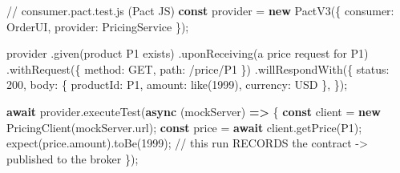 \documentclass[11pt]{article}
\newenvironment{Shaded}{\begin{snugshade}}{\end{snugshade}}
\newcommand{\AttributeTok}[1]{\textcolor[rgb]{0.16,0.50,0.73}{#1}}
\newcommand{\CommentTok}[1]{\textcolor[rgb]{0.48,0.49,0.49}{#1}}
\newcommand{\ControlFlowTok}[1]{\textcolor[rgb]{0.99,0.74,0.29}{\textbf{#1}}}
\newcommand{\DataTypeTok}[1]{\textcolor[rgb]{0.16,0.50,0.73}{#1}}
\newcommand{\DecValTok}[1]{\textcolor[rgb]{0.96,0.45,0.00}{#1}}
\newcommand{\FunctionTok}[1]{\textcolor[rgb]{0.56,0.27,0.68}{#1}}
\newcommand{\KeywordTok}[1]{\textcolor[rgb]{0.81,0.81,0.76}{\textbf{#1}}}
\newcommand{\NormalTok}[1]{\textcolor[rgb]{0.81,0.81,0.76}{#1}}
\newcommand{\OperatorTok}[1]{\textcolor[rgb]{0.81,0.81,0.76}{#1}}
\newcommand{\StringTok}[1]{\textcolor[rgb]{0.96,0.31,0.31}{#1}}
\begin{document}
\begin{Shaded}
\begin{Highlighting}[]
\CommentTok{// consumer.pact.test.js  (Pact JS)}
\KeywordTok{const}\NormalTok{ provider }\OperatorTok{=} \KeywordTok{new} \FunctionTok{PactV3}\NormalTok{(\{ }\DataTypeTok{consumer}\OperatorTok{:} \StringTok{\textquotesingle{}OrderUI\textquotesingle{}}\OperatorTok{,} \DataTypeTok{provider}\OperatorTok{:} \StringTok{\textquotesingle{}PricingService\textquotesingle{}}\NormalTok{ \})}\OperatorTok{;}

\NormalTok{provider}
  \OperatorTok{.}\FunctionTok{given}\NormalTok{(}\StringTok{\textquotesingle{}product P1 exists\textquotesingle{}}\NormalTok{)}
  \OperatorTok{.}\FunctionTok{uponReceiving}\NormalTok{(}\StringTok{\textquotesingle{}a price request for P1\textquotesingle{}}\NormalTok{)}
  \OperatorTok{.}\FunctionTok{withRequest}\NormalTok{(\{ }\DataTypeTok{method}\OperatorTok{:} \StringTok{\textquotesingle{}GET\textquotesingle{}}\OperatorTok{,} \DataTypeTok{path}\OperatorTok{:} \StringTok{\textquotesingle{}/price/P1\textquotesingle{}}\NormalTok{ \})}
  \OperatorTok{.}\FunctionTok{willRespondWith}\NormalTok{(\{}
    \DataTypeTok{status}\OperatorTok{:} \DecValTok{200}\OperatorTok{,}
    \DataTypeTok{body}\OperatorTok{:}\NormalTok{ \{ }\DataTypeTok{productId}\OperatorTok{:} \StringTok{\textquotesingle{}P1\textquotesingle{}}\OperatorTok{,} \DataTypeTok{amount}\OperatorTok{:} \FunctionTok{like}\NormalTok{(}\DecValTok{1999}\NormalTok{)}\OperatorTok{,} \DataTypeTok{currency}\OperatorTok{:} \StringTok{\textquotesingle{}USD\textquotesingle{}}\NormalTok{ \}}\OperatorTok{,}
\NormalTok{  \})}\OperatorTok{;}

\ControlFlowTok{await}\NormalTok{ provider}\OperatorTok{.}\FunctionTok{executeTest}\NormalTok{(}\KeywordTok{async}\NormalTok{ (mockServer) }\KeywordTok{=\textgreater{}}\NormalTok{ \{}
  \KeywordTok{const}\NormalTok{ client }\OperatorTok{=} \KeywordTok{new} \FunctionTok{PricingClient}\NormalTok{(mockServer}\OperatorTok{.}\AttributeTok{url}\NormalTok{)}\OperatorTok{;}
  \KeywordTok{const}\NormalTok{ price }\OperatorTok{=} \ControlFlowTok{await}\NormalTok{ client}\OperatorTok{.}\FunctionTok{getPrice}\NormalTok{(}\StringTok{\textquotesingle{}P1\textquotesingle{}}\NormalTok{)}\OperatorTok{;}
  \FunctionTok{expect}\NormalTok{(price}\OperatorTok{.}\AttributeTok{amount}\NormalTok{)}\OperatorTok{.}\FunctionTok{toBe}\NormalTok{(}\DecValTok{1999}\NormalTok{)}\OperatorTok{;}
  \CommentTok{// this run RECORDS the contract {-}\textgreater{} published to the broker}
\NormalTok{\})}\OperatorTok{;}
\end{Highlighting}
\end{Shaded}
\end{document}
